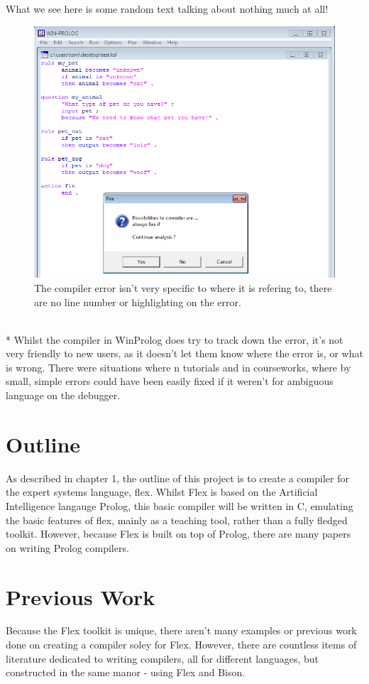 \documentclass[12pt]{report}
\begin{document}
What we see here is some random text talking about nothing much at all!
\begin{figure}[ht]
	\centering
		\includegraphics[scale=0.65]{flex_error2}
		\caption{The compiler error isn't very specific to where it is refering to, there are no line number or highlighting on the error.}
\end{figure}
\\*
Whilst the compiler in WinProlog does try to track down the error, it's not very friendly to new users, as it doesn't let them know where the error is, or what is wrong.  There were situations where n tutorials and in courseworks, where by small, simple errors could have been easily fixed if it weren't for ambiguous language on the debugger.
\clearpage
\section{Outline}\label{sec:outline}
As described in chapter 1, the outline of this project is to create a compiler for the expert systems language, flex.  Whilst Flex is based on the Artificial Intelligence langauge Prolog, this basic compiler will be written in C, emulating the basic features of flex, mainly as a teaching tool, rather than a fully fledged toolkit.  However, because Flex is built on top of Prolog, there are many papers on writing Prolog compilers.

\section{Previous Work}\label{sec:previous_work}
Because the Flex toolkit is unique, there aren't many examples or previous work done on creating a compiler soley for Flex.  However, there are countless items of literature dedicated to writing compilers, all for different languages, but constructed in the same manor - using Flex and Bison.
\end{document}

